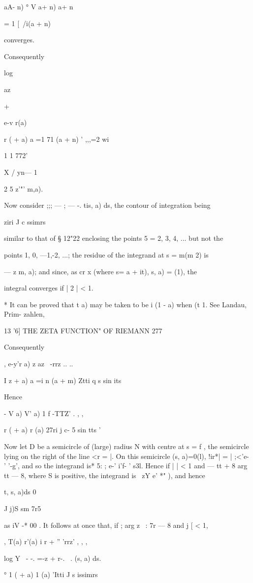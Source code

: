 {{ aA- n) ° V a+ n) a+ n

= 1 [\ /i(a + n)

converges.

Consequently

log

az

+

e-v r(a)

r ( + a) a =1 71 (a + n) ' ,,,=2 wi

1 1 772'

X / yn— 1

2 5 z'"' m,a).

Now consider ;;; — ; — -. tis, a) ds, the contour of integration being

ziri J c ssimrs

similar to that of § 12"22 enclosing the points 5 = 2, 3, 4, ... but
not the

points 1, 0, —1,-2, ...; the residue of the integrand at s = m(m 2) is

— z m, a); and since, as cr x (where s= a + it), s, a) = (1), the

integral converges if | 2 | < 1.

* It can be proved that t a) may be taken to be i (1 - a) when (t 1.
See Landau, Prim- zahlen, %

13 '6] THE ZETA FUNCTION" OF RIEMANN 277

Consequently

, e-y'r a) z az \ -rrz .. ..

I z + a) a =i n (a + m) Ztti q s sin its

Hence

- V a) V' a) 1 f -TTZ' . , ,

  r ( + a) r (a) 27ri j c- 5 sin tts '

Now let D be a semicircle of (large) radius N with centre at s = f ,
the semicircle lying on the right of the line <r = |. On this
semicircle (s, a)=0(l), !ir*| = | ;<'e- ' '-g', and so the integrand
is* 5: ; e-' i'f- ' s3l. Hence if | | < 1 and — tt + 8 arg tt — 8,
where S is positive, the integrand is \ zY e' *" ), and hence

t, s, a)ds 0

J j)S sm 7r5

as iV -* 00 . It follows at once that, if ; arg z \ : 7r — 8 and j [ <
1,

, T(a) r'(a) i r + '' 'rrz' , , ,

log Y ~- -. =-z + r-. ~. (s, a) ds.

° 1 ( + a) 1 (a) 'Itti J s issimrs

}}
